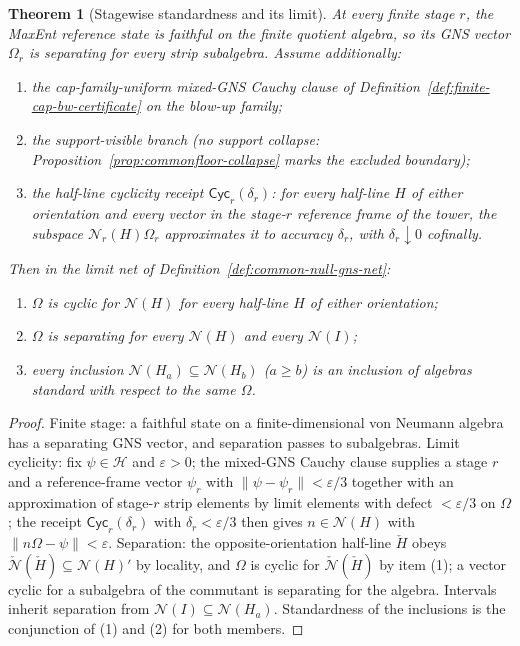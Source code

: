 \documentclass[11pt]{article}
\newtheorem{theorem}{Theorem}[section]
\begin{document}
\begin{theorem}[Stagewise standardness and its limit]
\label{thm:null-net-standardness}
At every finite stage \(r\), the MaxEnt reference state is faithful on the
finite quotient algebra, so its GNS vector \(\Omega_r\) is separating for
every strip subalgebra. Assume additionally:
\begin{enumerate}[leftmargin=2em]
\item the cap-family-uniform mixed-GNS Cauchy clause of
Definition~\ref{def:finite-cap-bw-certificate} on the blow-up family;
\item the support-visible branch (no support collapse:
Proposition~\ref{prop:commonfloor-collapse} marks the excluded boundary);
\item the \emph{half-line cyclicity receipt} \(\mathsf{Cyc}_r(\delta_r)\):
for every half-line \(H\) of either orientation and every vector in the
stage-\(r\) reference frame of the tower, the subspace
\(\mathcal N_r(H)\Omega_r\) approximates it to accuracy \(\delta_r\), with
\(\delta_r\downarrow0\) cofinally.
\end{enumerate}
Then in the limit net of Definition~\ref{def:common-null-gns-net}:
\begin{enumerate}[leftmargin=2em]
\item \(\Omega\) is cyclic for \(\mathcal N(H)\) for every half-line \(H\) of
either orientation;
\item \(\Omega\) is separating for every \(\mathcal N(H)\) and every
\(\mathcal N(I)\);
\item every inclusion \(\mathcal N(H_{a})\subseteq\mathcal N(H_{b})\)
(\(a\geq b\)) is an inclusion of algebras standard with respect to the same
\(\Omega\).
\end{enumerate}
\end{theorem}

\begin{proof}
Finite stage: a faithful state on a finite-dimensional von Neumann algebra has
a separating GNS vector, and separation passes to subalgebras. Limit
cyclicity: fix \(\psi\in\mathcal H\) and \(\varepsilon>0\); the mixed-GNS
Cauchy clause supplies a stage \(r\) and a reference-frame vector
\(\psi_r\) with \(\|\psi-\psi_r\|<\varepsilon/3\) together with an
approximation of stage-\(r\) strip elements by limit elements with defect
\(<\varepsilon/3\) on \(\Omega\); the receipt \(\mathsf{Cyc}_r(\delta_r)\)
with \(\delta_r<\varepsilon/3\) then gives \(n\in\mathcal N(H)\) with
\(\|n\Omega-\psi\|<\varepsilon\). Separation: the opposite-orientation
half-line \(\check H\) obeys
\(\check{\mathcal N}(\check H)\subseteq\mathcal N(H)'\) by locality, and
\(\Omega\) is cyclic for \(\check{\mathcal N}(\check H)\) by item (1);
a vector cyclic for a subalgebra of the commutant is separating for the
algebra. Intervals inherit separation from
\(\mathcal N(I)\subseteq\mathcal N(H_a)\). Standardness of the inclusions is
the conjunction of (1) and (2) for both members.
\end{proof}
\end{document}
